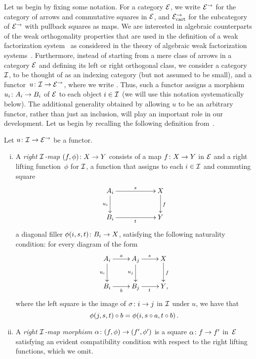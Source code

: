 \documentclass[reqno,10pt,a4paper,oneside,draft]{amsart}
\begin{document}
Let us begin by fixing some notation. For a category $\catE$, we write $\cal{E}^\to$ for the category of arrows and commutative squares in $\cal{E}$, and $\cal{E}^\to_{\cart}$ for the
subcategory of $\cal{E}^\to$ with pullback squares as maps. 
We are interested in algebraic counterparts of the weak orthogonality properties that are used in the definition of a weak factorization system~\cite{bousfield-wfs} as considered in the theory of algebraic weak factorization systems~\cite{grandis-tholen-nwfs}.
Furthermore, instead of starting from a mere class of arrows in a category $\catE$ and defining its left or right orthogonal class, we consider a category~$\cal{I}$, to be thought of as an indexing category (but not assumed to be small), and a functor~$u \co \cal{I} \to \catE^\to$,
where we write .
Thus, such a functor assigns a morphism $u_i \co A_i \to B_i$ of $\catE$ to each object $i \in \cal{I}$ (we will use this notation systematically below).
The additional generality obtained by allowing $u$ to be an arbitrary functor, rather than just an inclusion, will play an important role in our development.
Let us begin by recalling the following definition from~\cite{garner:small-object-argument}.

\begin{definition} \label{def:right-map}
Let $u \co \cal{I} \to \catE^\to$ be a functor.
\begin{enumerate}[(i)]
\item A \emph{right $\cal{I}$-map} $(f, \phi) \co X \to Y$ consists of a map $f \co X \to Y$ in $\catE$ and a right lifting function~$\phi$ for $\cal{I}$, \ie a function that assigns to each $i \in \cal{I}$ and commuting square
\[
\xymatrix@C=2cm{
  A_i
  \ar[r]^{s}
  \ar[d]_{u_i}
&
  X
  \ar[d]^f
\\
  B_i
  \ar[r]_{t}
&
  Y
}
\]
a diagonal filler $\phi(i,s, t) \co B_i \to X$, satisfying the following naturality condition: for every diagram of the form
\[
\xymatrix{
  A_i
  \ar[r]^{a}
  \ar[d]_{u_i}
&
  A_j
  \ar[r]^{s}
  \ar[d]_{u_j}
&
  X
  \ar[d]^f
\\
  B_i
  \ar[r]_{b}
&
  B_j
  \ar[r]_{t}
&
  Y
\rlap{,}}
\]
where the left square is the image of $\sigma \co i \to j$ in $\cal{I}$ under $u$, we have that
\[
  \phi(j, s, t) \cc b = \phi(i, s \cc a, t \cc b) \, .
\]
\item A \emph{right $\cal{I}$-map morphism} $\alpha \co (f, \phi) \to (f', \phi')$ is a square $\alpha \co f \to f'$ in~$\catE$ satisfying an evident compatibility condition with respect to the right lifting functions, which we omit.
\end{enumerate}
\end{definition}
\end{document}
